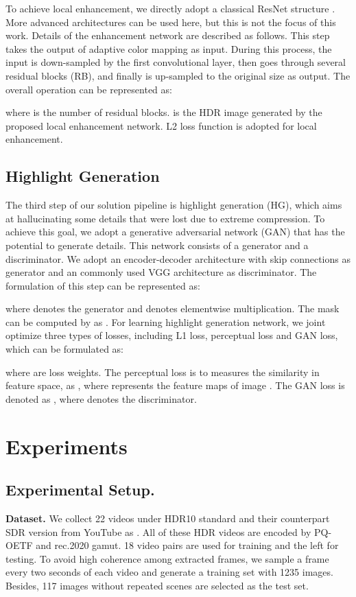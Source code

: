 \documentclass[10pt,twocolumn,letterpaper]{article}
\begin{document}
To achieve local enhancement, we directly adopt a classical ResNet structure \cite{he2016identity}. More advanced architectures can be used here, but this is not the focus of this work. Details of the enhancement network are described as follows. This step takes the output of adaptive color mapping as input. During this process, the input is down-sampled by the first convolutional layer, then goes through several residual blocks (RB), and finally is up-sampled to the original size as output. The overall operation can be represented as:

where  is the number of residual blocks.  is the HDR image generated by the proposed local enhancement network. L2 loss function is adopted for local enhancement.

\subsection{Highlight Generation}
The third step of our solution pipeline is highlight generation (HG), which aims at hallucinating some details that were lost due to extreme compression. To achieve this goal, we adopt a generative adversarial network (GAN) \cite{goodfellow2014generative} that has the potential to generate details. This network consists of a generator and a discriminator. We adopt an encoder-decoder architecture with skip connections \cite{ronneberger2015u} as generator and an commonly used VGG architecture \cite{simonyan2014very} as discriminator. The formulation of this step can be represented as:

where  denotes the generator and  denotes elementwise multiplication. The mask  can be computed by  as \cite{liu2020single}. For learning highlight generation network, we joint optimize three types of losses, including L1 loss, perceptual loss and GAN loss, which can be formulated as:

where  are loss weights. The perceptual loss is to measures the similarity in feature space, as , where  represents the feature maps of image . The GAN loss is denoted as , where  denotes the discriminator.

\section{Experiments}
\label{Experiments}
\subsection{Experimental Setup.}
\textbf{Dataset.} We collect 22 videos under HDR10 standard and their counterpart SDR version from YouTube as \cite{kim2019deep}. All of these HDR videos are encoded by PQ-OETF and rec.2020 gamut. 18 video pairs are used for training and the left for testing. To avoid high coherence among extracted frames, we sample a frame every two seconds of each video and generate a training set with 1235 images. 
Besides, 117 images without repeated scenes are selected as the test set.
\end{document}
